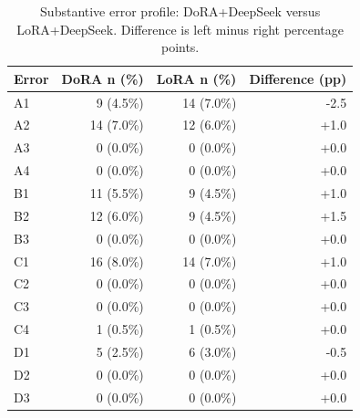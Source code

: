 \begin{table}[htbp]
\centering
\small
\begin{tabular}{lrrr}
\toprule
Error & DoRA n (\%) & LoRA n (\%) & Difference (pp) \\
\midrule
A1 & 9 (4.5\%) & 14 (7.0\%) & -2.5 \\
A2 & 14 (7.0\%) & 12 (6.0\%) & +1.0 \\
A3 & 0 (0.0\%) & 0 (0.0\%) & +0.0 \\
A4 & 0 (0.0\%) & 0 (0.0\%) & +0.0 \\
B1 & 11 (5.5\%) & 9 (4.5\%) & +1.0 \\
B2 & 12 (6.0\%) & 9 (4.5\%) & +1.5 \\
B3 & 0 (0.0\%) & 0 (0.0\%) & +0.0 \\
C1 & 16 (8.0\%) & 14 (7.0\%) & +1.0 \\
C2 & 0 (0.0\%) & 0 (0.0\%) & +0.0 \\
C3 & 0 (0.0\%) & 0 (0.0\%) & +0.0 \\
C4 & 1 (0.5\%) & 1 (0.5\%) & +0.0 \\
D1 & 5 (2.5\%) & 6 (3.0\%) & -0.5 \\
D2 & 0 (0.0\%) & 0 (0.0\%) & +0.0 \\
D3 & 0 (0.0\%) & 0 (0.0\%) & +0.0 \\
\bottomrule
\end{tabular}
\caption{Substantive error profile: DoRA+DeepSeek versus LoRA+DeepSeek. Difference is left minus right percentage points.}
\label{tab:dora_lora_dora_deepseek_vs_lora_deepseek}
\end{table}
